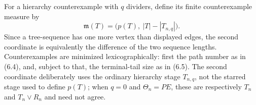 \begin{definition}
For a hierarchy counterexample with $q$ dividers, define its finite
counterexample measure by
\[
 \mathfrak m(T)=\bigl(p(T),\ |T|-|T_{n,q}|\bigr).
\]
Since a tree-sequence has one more vertex than displayed edges, the
second coordinate is equivalently the difference of the two sequence
lengths.  Counterexamples are minimized lexicographically: first the
path number as in (6.4), and, subject to that, the terminal-tail size as
in (6.5).  The second coordinate deliberately uses the ordinary
hierarchy stage $T_{n,q}$, not the starred stage used to define $p(T)$;
when $q=0$ and $\Theta_n=PE$, these are respectively $T_n$ and
$T_n\vee R_n$ and need not agree.
\end{definition}
